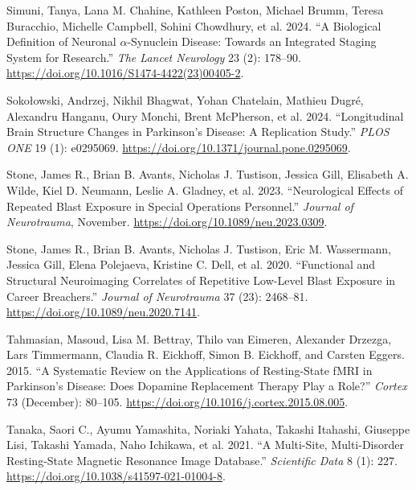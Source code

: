 \documentclass[
  table]{article}
\newlength{\cslhangindent}
\newenvironment{CSLReferences}[2] %
 {\begin{list}{}{%
  \setlength{\itemindent}{0pt}
  \setlength{\leftmargin}{0pt}
  \setlength{\parsep}{0pt}
  \ifodd #1
   \setlength{\leftmargin}{\cslhangindent}
   \setlength{\itemindent}{-1\cslhangindent}
  \fi
  \setlength{\itemsep}{#2\baselineskip}}}
 {\end{list}}
\begin{document}
\begin{CSLReferences}{1}{0}
Simuni, Tanya, Lana M. Chahine, Kathleen Poston, Michael Brumm, Teresa
Buracchio, Michelle Campbell, Sohini Chowdhury, et al. 2024. {``A
Biological Definition of Neuronal \(\alpha\)-Synuclein Disease: Towards
an Integrated Staging System for Research.''} \emph{The Lancet
Neurology} 23 (2): 178--90.
\url{https://doi.org/10.1016/S1474-4422(23)00405-2}.

Sokołowski, Andrzej, Nikhil Bhagwat, Yohan Chatelain, Mathieu Dugré,
Alexandru Hanganu, Oury Monchi, Brent McPherson, et al. 2024.
{``Longitudinal Brain Structure Changes in {Parkinson}{'}s Disease: {A}
Replication Study.''} \emph{PLOS ONE} 19 (1): e0295069.
\url{https://doi.org/10.1371/journal.pone.0295069}.

Stone, James R., Brian B. Avants, Nicholas J. Tustison, Jessica Gill,
Elisabeth A. Wilde, Kiel D. Neumann, Leslie A. Gladney, et al. 2023.
{``Neurological {Effects} of {Repeated} {Blast} {Exposure} in {Special}
{Operations} {Personnel}.''} \emph{Journal of Neurotrauma}, November.
\url{https://doi.org/10.1089/neu.2023.0309}.

Stone, James R., Brian B. Avants, Nicholas J. Tustison, Eric M.
Wassermann, Jessica Gill, Elena Polejaeva, Kristine C. Dell, et al.
2020. {``Functional and {Structural} {Neuroimaging} {Correlates} of
{Repetitive} {Low}-{Level} {Blast} {Exposure} in {Career}
{Breachers}.''} \emph{Journal of Neurotrauma} 37 (23): 2468--81.
\url{https://doi.org/10.1089/neu.2020.7141}.

Tahmasian, Masoud, Lisa M. Bettray, Thilo van Eimeren, Alexander
Drzezga, Lars Timmermann, Claudia R. Eickhoff, Simon B. Eickhoff, and
Carsten Eggers. 2015. {``A Systematic Review on the Applications of
Resting-State {fMRI} in {Parkinson}'s Disease: {Does} Dopamine
Replacement Therapy Play a Role?''} \emph{Cortex} 73 (December):
80--105. \url{https://doi.org/10.1016/j.cortex.2015.08.005}.

Tanaka, Saori C., Ayumu Yamashita, Noriaki Yahata, Takashi Itahashi,
Giuseppe Lisi, Takashi Yamada, Naho Ichikawa, et al. 2021. {``A
Multi-Site, Multi-Disorder Resting-State Magnetic Resonance Image
Database.''} \emph{Scientific Data} 8 (1): 227.
\url{https://doi.org/10.1038/s41597-021-01004-8}.


\end{CSLReferences}
\end{document}
